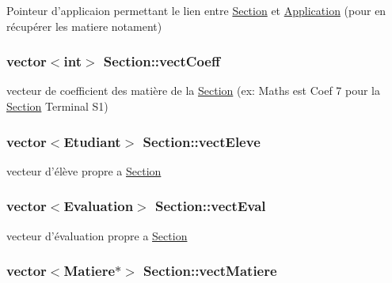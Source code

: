 Pointeur d'applicaion permettant le lien entre \hyperlink{class_section}{Section} et \hyperlink{class_application}{Application} (pour en récupérer les matiere notament) 

\hypertarget{class_section_a804c0479bba4cb92a12823c10e1e6944}{
\subsubsection[{vect\+Coeff}]{\setlength{\rightskip}{0pt plus 5cm}vector$<$int$>$ Section\+::vect\+Coeff\hspace{0.3cm}{\ttfamily [private]}}}\label{class_section_a804c0479bba4cb92a12823c10e1e6944}


vecteur de coefficient des matière de la \hyperlink{class_section}{Section} (ex\+: Maths est Coef 7 pour la \hyperlink{class_section}{Section} Terminal S1) 

\hypertarget{class_section_a53c0f63296e6c0a58208f3f13b6eb1a0}{
\subsubsection[{vect\+Eleve}]{\setlength{\rightskip}{0pt plus 5cm}vector$<${\bf Etudiant}$>$ Section\+::vect\+Eleve\hspace{0.3cm}{\ttfamily [private]}}}\label{class_section_a53c0f63296e6c0a58208f3f13b6eb1a0}


vecteur d'élève propre a \hyperlink{class_section}{Section} 

\hypertarget{class_section_ad1006e87bbe4c2ac441c12504cc16fa4}{
\subsubsection[{vect\+Eval}]{\setlength{\rightskip}{0pt plus 5cm}vector$<${\bf Evaluation}$>$ Section\+::vect\+Eval\hspace{0.3cm}{\ttfamily [private]}}}\label{class_section_ad1006e87bbe4c2ac441c12504cc16fa4}


vecteur d'évaluation propre a \hyperlink{class_section}{Section} 

\hypertarget{class_section_ab4d854da53a93ae314bef4f849ab7649}{
\subsubsection[{vect\+Matiere}]{\setlength{\rightskip}{0pt plus 5cm}vector$<${\bf Matiere}$\ast$$>$ Section\+::vect\+Matiere\hspace{0.3cm}{\ttfamily [private]}}}\label{class_section_ab4d854da53a93ae314bef4f849ab7649}



